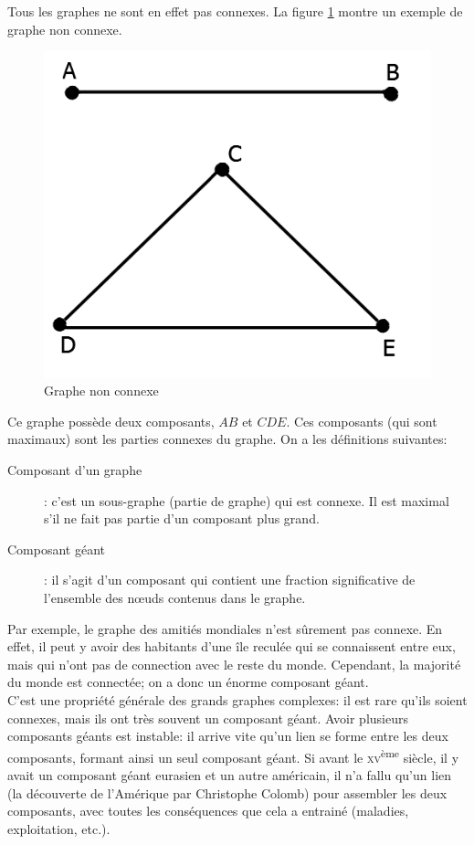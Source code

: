 Tous les graphes ne sont en effet pas connexes. La figure \ref{graphe_non_connexe} montre un exemple de graphe non connexe.
	\begin{figure}
	\center
	\includegraphics[scale=0.3]{images/18_graphe_non_connexe.png}
	\caption{\label{graphe_non_connexe} Graphe non connexe}
	\end{figure}
Ce graphe possède deux composants, $AB$ et $CDE$. Ces composants (qui sont maximaux) sont les parties connexes du graphe. On a les définitions suivantes:
	\begin{description}
    \item[Composant d'un graphe]: c'est un sous-graphe (partie de graphe) qui est connexe. Il est maximal s'il ne fait pas partie d'un composant plus grand.
    \item[Composant géant] : il s'agit d'un composant qui contient une fraction significative de l'ensemble des n\oe uds contenus dans le graphe.
    \end{description}
    
    Par exemple, le graphe des amitiés mondiales n'est sûrement pas connexe. En effet, il peut y avoir des habitants d'une île reculée qui se connaissent entre eux, mais qui n'ont pas de connection avec le reste du monde. Cependant, la majorité du monde est connectée; on a donc un énorme composant géant.\\
    
    C'est une propriété générale des grands graphes complexes: il est rare qu'ils soient connexes, mais ils ont très souvent un composant géant. Avoir plusieurs composants géants est instable: il arrive vite qu'un lien se forme entre les deux composants, formant ainsi un seul composant géant. Si avant le \textsc{xv}\textsuperscript{ème} siècle, il y avait un composant géant eurasien et un autre américain, il n'a fallu qu'un lien (la découverte de l'Amérique par Christophe Colomb) pour assembler les deux composants, avec toutes les conséquences que cela a entrainé (maladies, exploitation, etc.).\\
    

